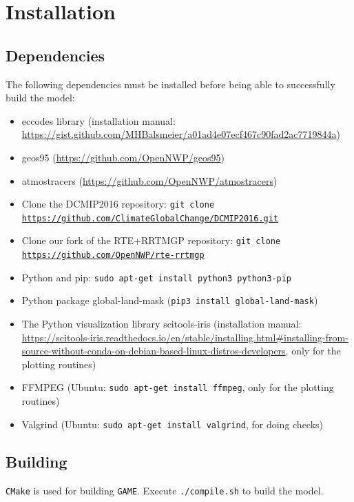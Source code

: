 \documentclass[10pt]{report}
\begin{document}
\chapter{Installation}
\label{chap:installation}

\section{Dependencies}
\label{sec:dependencies}

The following dependencies must be installed before being able to successfully build the model:

\begin{itemize}
\item eccodes library (installation manual: \url{https://gist.github.com/MHBalsmeier/a01ad4e07ecf467c90fad2ac7719844a})
\item geos95 (\url{https://github.com/OpenNWP/geos95})
\item atmostracers (\url{https://github.com/OpenNWP/atmostracers})
\item Clone the DCMIP2016 repository: \texttt{git clone \url{https://github.com/ClimateGlobalChange/DCMIP2016.git}}
\item Clone our fork of the RTE+RRTMGP repository: \texttt{git clone \url{https://github.com/OpenNWP/rte-rrtmgp}}
\item Python and pip: \texttt{sudo apt-get install python3 python3-pip}
\item Python package global-land-mask (\texttt{pip3 install global-land-mask})
\item The Python visualization library scitools-iris (installation manual: \url{https://scitools-iris.readthedocs.io/en/stable/installing.html#installing-from-source-without-conda-on-debian-based-linux-distros-developers}, only for the plotting routines)
\item FFMPEG (Ubuntu: \texttt{sudo apt-get install ffmpeg}, only for the plotting routines)
\item Valgrind (Ubuntu: \texttt{sudo apt-get install valgrind}, for doing checks)
\end{itemize}

\section{Building}
\label{sec:building}

\texttt{CMake} is used for building \texttt{GAME}. Execute \texttt{./compile.sh} to build the model.
\end{document}
